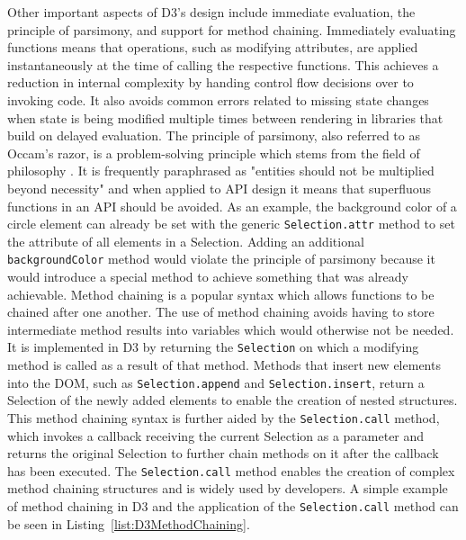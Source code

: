 Other important aspects of D3's design include immediate evaluation, the principle of parsimony, and support for method chaining.
Immediately evaluating functions means that operations, such as modifying attributes, are applied instantaneously at the time of calling the respective functions.
This achieves a reduction in internal complexity by handing control flow decisions over to invoking code.
It also avoids common errors related to missing state changes when state is being modified multiple times between rendering in libraries that build on delayed evaluation.
The principle of parsimony, also referred to as Occam's razor, is a problem-solving principle which stems from the field of philosophy \parencite{PrincipleOfParsimony}.
It is frequently paraphrased as "entities should not be multiplied beyond necessity" and when applied to API design it means that superfluous functions in an API should be avoided.
As an example, the background color of a circle element can already be set with the generic \lstinline{Selection.attr} method to set the  attribute of all elements in a Selection.
Adding an additional \lstinline{backgroundColor} method would violate the principle of parsimony because it would introduce a special method to achieve something that was already achievable.
Method chaining is a popular syntax which allows functions to be chained after one another.
The use of method chaining avoids having to store intermediate method results into variables which would otherwise not be needed.
It is implemented in D3 by returning the \lstinline{Selection} on which a modifying method is called as a result of that method.
Methods that insert new elements into the DOM, such as \lstinline{Selection.append} and \lstinline{Selection.insert}, return a Selection of the newly added elements to enable the creation of nested structures.
This method chaining syntax is further aided by the \lstinline{Selection.call} method, which invokes a callback receiving the current Selection as a parameter and returns the original Selection to further chain methods on it after the callback has been executed.
The \lstinline{Selection.call} method enables the creation of complex method chaining structures and is widely used by developers.
A simple example of method chaining in D3 and the application of the \lstinline{Selection.call} method can be seen in Listing~\ref{list:D3MethodChaining}.

\begin{samepage}
 
    A simple example of method chaining in D3 which creates an  and  element inside a .
  },
]{listings/d3-method-chaining.js}
\end{samepage}

